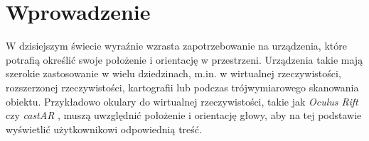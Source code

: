 
\chapter*{Wprowadzenie}

W dzisiejszym świecie wyraźnie wzrasta zapotrzebowanie na urządzenia,
które potrafią określić swoje położenie i orientację w przestrzeni.
Urządzenia takie mają szerokie zastosowanie w wielu dziedzinach, m.in. w
wirtualnej rzeczywistości, rozszerzonej rzeczywistości, kartografii lub 
 podczas trójwymiarowego skanowania obiektu.
Przykładowo okulary do wirtualnej rzeczywistości, takie jak \textit{Oculus Rift} \cite{bib:OculusRift} 
czy \textit{castAR} \cite{bib:castAR},
muszą uwzględnić położenie i orientację głowy, aby na tej podstawie wyświetlić użytkownikowi 
odpowiednią treść. 



